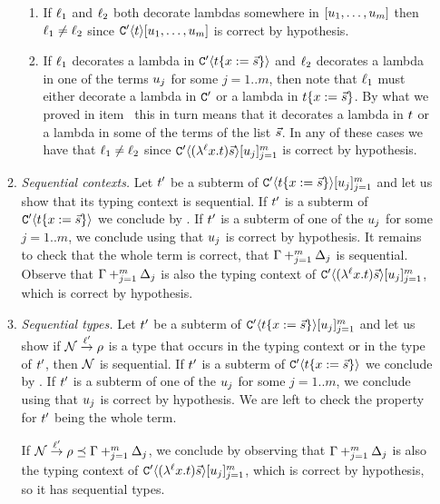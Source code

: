 \begin{enumerate}
\begin{enumerate}
\begin{enumerate}
      \item
        If $\ell_1$ and $\ell_2$ both decorate lambdas somewhere in $[u_1,\hdots,u_m]$
        then $\ell_1 \neq \ell_2$ since $\mathtt{C}'\langle t\rangle[u_1,\hdots,u_m]$ is correct by hypothesis.
      \item
        If $\ell_1$ decorates a lambda in $\mathtt{C}'\langle t\{x := \vec{s}\}\rangle$
        and $\ell_2$ decorates a lambda in one of the terms $u_j$ for some $j=1..m$,
        then note that $\ell_1$ must either decorate a lambda in $\mathtt{C}'$ or a lambda in $t\{x := \vec{s}\}$.
        By what we proved in item~
        this in turn means that it decorates a lambda in $t$ or a lambda in some of the terms of the list $\vec{s}$.
        In any of these cases we have that $\ell_1 \neq \ell_2$
        since $\mathtt{C}'\langle(\lambda^{\ell} x. t)\vec{s}\rangle[u_j]_{j=1}^m$ is correct by hypothesis.
      \end{enumerate}
    \item {\em Sequential contexts.}
      Let $t'$ be a subterm of $\mathtt{C}'\langle t\{x := \vec{s}\}\rangle[u_j]_{j=1}^m$
      and let us show that its typing context is sequential.
      If $t'$ is a subterm of $\mathtt{C}'\langle t\{x := \vec{s}\}\rangle$ we conclude by \ih.
      If $t'$ is a subterm of one of the $u_j$ for some $j=1..m$, we conclude using that $u_j$ is correct by hypothesis.
      It remains to check that the whole term is correct, \ie that $\Gamma +_{j=1}^m \Delta_j$ is sequential.
      Observe that $\Gamma +_{j=1}^m \Delta_j$ is also the typing context of
      $\mathtt{C}'\langle(\lambda^{\ell} x. t)\vec{s}\rangle[u_j]_{j=1}^m$, which is correct by hypothesis.
    \item {\em Sequential types.}
      Let $t'$ be a subterm of $\mathtt{C}'\langle t\{x := \vec{s}\}\rangle[u_j]_{j=1}^m$
      and let us show if $\mathcal{N} \overset{\ell'}{\to} \rho$ is a type
      that occurs in the typing context or in the type of $t'$, then $\mathcal{N}$ is sequential.
      If $t'$ is a subterm of $\mathtt{C}'\langle t\{x := \vec{s}\}\rangle$ we conclude by \ih.
      If $t'$ is a subterm of one of the $u_j$ for some $j=1..m$, we conclude using that $u_j$ is correct by hypothesis.
      We are left to check the property for $t'$ being the whole term.

      If $\mathcal{N} \overset{\ell'}{\to} \rho \preceq \Gamma +_{j=1}^m \Delta_j$,
      we conclude by observing
      that $\Gamma +_{j=1}^m \Delta_j$ is also the typing context of $\mathtt{C}'\langle(\lambda^{\ell} x. t)\vec{s}\rangle[u_j]_{j=1}^m$,
      which is correct by hypothesis, so it has sequential types.
      

\end{enumerate}
\end{enumerate}
